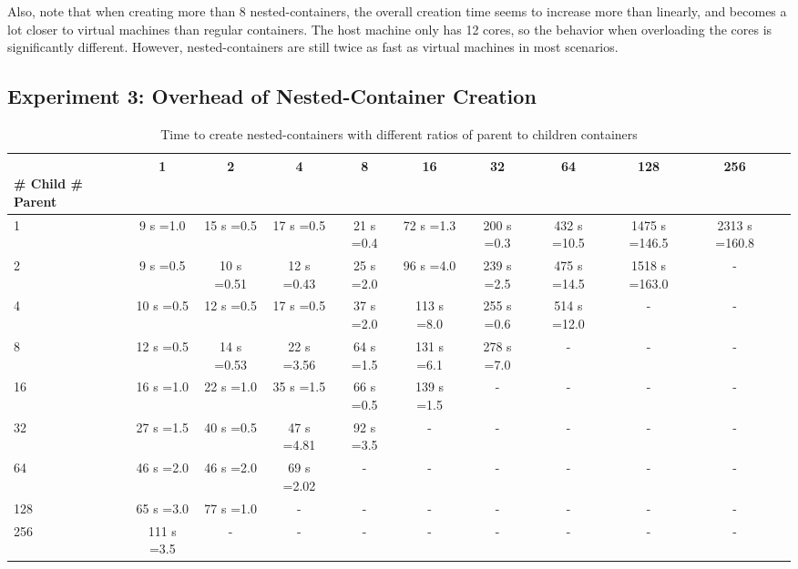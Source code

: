 \documentclass[conference]{IEEEtran}
\begin{document}
Also, note that when creating more than 8 nested-containers, the overall
creation time seems to increase more than linearly, and becomes a lot closer
to virtual machines than regular containers. The host machine only has 12
cores, so the behavior when overloading the cores is significantly different.
However, nested-containers are still twice as fast as virtual machines in most
scenarios.



\subsection{Experiment 3: Overhead of Nested-Container Creation}
\label{sub:exp3}

\begin{table*}
\renewcommand{\arraystretch}{1.3}
\centering
\caption {Time to create nested-containers with different ratios of parent
    to children containers}
\begin{tabular}{|l||c|c|c|c|c|c|c|c|c|c|}\hline
\diaghead{\theadfont Parenttttttttt Child}{\\ \# Child }{\# Parent}&1&  2                &	4          &	8                 &	16                &	32             &	64            &	128             &	256\\    \hline
\hline
1       &9  s =1.0&15 s =0.5 &17 s =0.5 &21 s =0.4 &72 s =1.3   &200 s =0.3 &432 s =10.5 &1475 s =146.5 &2313 s =160.8\\    \hline
2       &9  s =0.5&10 s =0.51&12 s =0.43&25 s =2.0 &96 s =4.0   &239 s =2.5 &475 s =14.5	&1518 s =163.0 &-	\\   \hline
4       &10 s =0.5&12 s =0.5 &17 s =0.5 &37 s =2.0 &113 s =8.0  &255 s =0.6 &514 s =12.0 &-		 &-  \\    \hline
8       &12 s =0.5&14 s =0.53&22 s =3.56&64 s =1.5 &131 s =6.1 &278 s =7.0 &-		&-	     &-  \\    \hline
16      &16 s =1.0&22 s =1.0 &35 s =1.5&66 s =0.5   &139 s =1.5&-	    &-	    &-		 &-  \\    \hline
32      &27 s =1.5&40 s =0.5 &47 s =4.81&92 s =3.5  & -		           &-	       &-	    &-	     &-  \\    \hline
64      &46 s =2.0&46 s =2.0 &69 s =2.02&-	                 &-		            &-	       &-	    &-	     &- \\    \hline
128     &65 s =3.0&77 s =1.0 &-      	          &-	             &-		            &-	    &-	       &-	     &-  \\    \hline
256     &111 s =3.5&-	            &-	                   &-	              &-		          &-	    &-	       &-	     &-   \\    \hline
\end{tabular}
\label{tab:creation-time-nested}
\end{table*}
\end{document}
